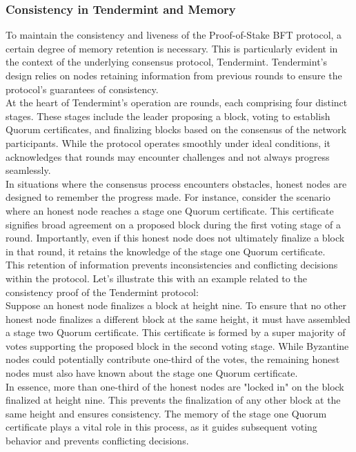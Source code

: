 \subsubsection{Consistency in Tendermint and Memory}
To maintain the consistency and liveness of the Proof-of-Stake BFT protocol, a certain degree of memory retention is necessary. This is particularly evident in the context of the underlying consensus protocol, Tendermint. Tendermint's design relies on nodes retaining information from previous rounds to ensure the protocol's guarantees of consistency.\\
At the heart of Tendermint's operation are rounds, each comprising four distinct stages. These stages include the leader proposing a block, voting to establish Quorum certificates, and finalizing blocks based on the consensus of the network participants. While the protocol operates smoothly under ideal conditions, it acknowledges that rounds may encounter challenges and not always progress seamlessly.\\
In situations where the consensus process encounters obstacles, honest nodes are designed to remember the progress made. For instance, consider the scenario where an honest node reaches a stage one Quorum certificate. This certificate signifies broad agreement on a proposed block during the first voting stage of a round. Importantly, even if this honest node does not ultimately finalize a block in that round, it retains the knowledge of the stage one Quorum certificate.\\
This retention of information prevents inconsistencies and conflicting decisions within the protocol. Let's illustrate this with an example related to the consistency proof of the Tendermint protocol:\\
Suppose an honest node finalizes a block at height nine. To ensure that no other honest node finalizes a different block at the same height, it must have assembled a stage two Quorum certificate. This certificate is formed by a super majority of votes supporting the proposed block in the second voting stage. While Byzantine nodes could potentially contribute one-third of the votes, the remaining honest nodes must also have known about the stage one Quorum certificate.\\
In essence, more than one-third of the honest nodes are "locked in" on the block finalized at height nine. This prevents the finalization of any other block at the same height and ensures consistency. The memory of the stage one Quorum certificate plays a vital role in this process, as it guides subsequent voting behavior and prevents conflicting decisions.\\
